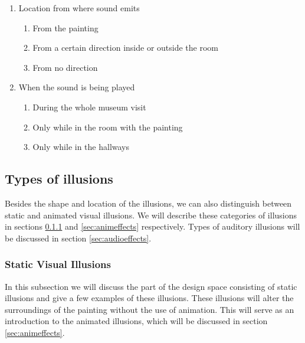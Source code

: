 \documentclass[a4paper]{article}
\begin{document}
\begin{enumerate}
\item{Location from where sound emits}
\begin{enumerate}
\item From the painting
\item From a certain direction inside or outside the room
\item From no direction 
\end{enumerate}
\item{When the sound is being played}
\begin{enumerate}
\item During the whole museum visit
\item Only while in the room with the painting
\item Only while in the hallways
\end{enumerate}
\end{enumerate}

\subsection {Types of illusions}\label{sec:typesofillusions} 
Besides the shape and location of the illusions, we can also distinguish between static and animated visual illusions. We will describe these categories of illusions in sections \ref{sec:stateffects} and \ref{sec:animeffects} respectively. Types of auditory illusions will be discussed in section \ref{sec:audioeffects}.

\subsubsection{Static Visual Illusions}\label{sec:stateffects}

In this subsection we will discuss the part of the design space consisting of static illusions and give a few examples of these illusions. These illusions will alter the surroundings of the painting without the use of animation. This will serve as an introduction to the animated illusions, which will be discussed in section \ref{sec:animeffects}.
\end{document}
